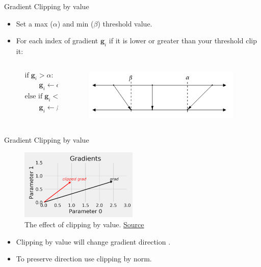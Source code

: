\documentclass[compress,oilve,t]{beamer}
\newcommand{\tc}[2]{
	\textcolor{#1}{\hspace{-2pt}#2\hspace{-2pt}}
}
\begin{document}
\begin{frame}{Gradient Clipping by value}
	\begin{itemize}
		\item Set a max ($\alpha$) and min ($\beta$) threshold value.
		\item For each index of gradient $\bm{g}_i$ if it is lower or greater than your threshold clip it:
		\begin{columns}
			\centering
			\begin{column}{0.3\textwidth}
				\centering
				\[
				\begin{aligned}
					&\text{if} \; \bm{g}_i > \alpha: \\
					&\qquad \bm{g}_i \gets \alpha \\
					&\text{else if} \; \bm{g}_i < \beta: \\
					&\qquad \bm{g}_i \gets \beta
				\end{aligned}
				\]
			\end{column}
			\begin{column}{0.45\textwidth}
				\centering
				\begin{figure}[H]
					\centering	\includegraphics[width=0.95\textwidth]{Figs/clipping-value.png}
				\end{figure}
			\end{column}
		\end{columns}
	\end{itemize}
\end{frame}

\begin{frame}{Gradient Clipping by value}
	\begin{figure}[H]
		\centering
		\includegraphics[width=0.5\textwidth]{Figs/clip-by-value.png}
		\caption{The effect of clipping by value. \href{https://github.com/dvgodoy/PyTorchStepByStep/blob/master/ChapterExtra.ipynb}{Source}}
	\end{figure}
	\begin{itemize}
		\item Clipping by value \tc{keywords}{will change gradient direction}.
		\item To preserve direction use clipping by norm.
	\end{itemize}
\end{frame}
\end{document}
